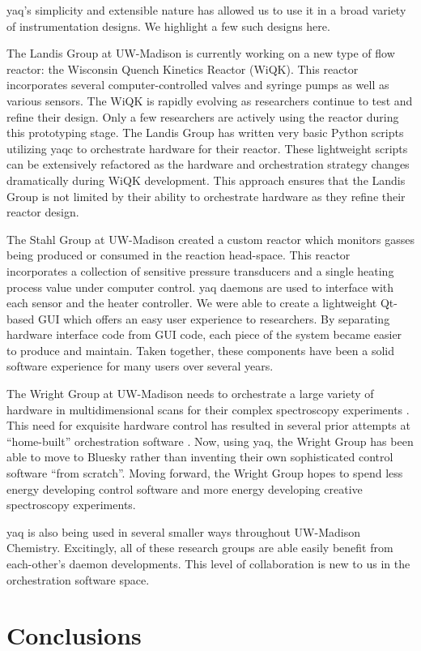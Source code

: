 \documentclass{article}
\begin{document}
yaq's simplicity and extensible nature has allowed us to use it in a broad variety of instrumentation designs.
We highlight a few such designs here.

The Landis Group at UW-Madison is currently working on a new type of flow reactor: the Wisconsin Quench Kinetics Reactor (WiQK).
This reactor incorporates several computer-controlled valves and syringe pumps as well as various sensors.
The WiQK is rapidly evolving as researchers continue to test and refine their design.
Only a few researchers are actively using the reactor during this prototyping stage.
The Landis Group has written very basic Python scripts utilizing yaqc to orchestrate hardware for their reactor.
These lightweight scripts can be extensively refactored as the hardware and orchestration strategy changes dramatically during WiQK development.
This approach ensures that the Landis Group is not limited by their ability to orchestrate hardware as they refine their reactor design.

The Stahl Group at UW-Madison created a custom reactor which monitors gasses being produced or consumed in the reaction head-space.  \cite{SalazarChaseA2021a}
This reactor incorporates a collection of sensitive pressure transducers and a single heating process value under computer control.
yaq daemons are used to interface with each sensor and the heater controller.
We were able to create a lightweight Qt-based GUI which offers an easy user experience to researchers.
By separating hardware interface code from GUI code, each piece of the system became easier to produce and maintain.
Taken together, these components have been a solid software experience for many users over several years.

The Wright Group at UW-Madison needs to orchestrate a large variety of hardware in multidimensional scans for their complex spectroscopy experiments \cite{MukamelShaul2000a, WrightJohnCurtis2011a}.
This need for exquisite hardware control has resulted in several prior attempts at ``home-built'' orchestration software \cite{CarlsonRogerJohn1988a, MeyerKentAlbert2004b, KainSchuyler2017a, ThompsonBlaiseJonathan2018a}.
Now, using yaq, the Wright Group has been able to move to Bluesky rather than inventing their own sophisticated control software ``from scratch''.
Moving forward, the Wright Group hopes to spend less energy developing control software and more energy developing creative spectroscopy experiments.

yaq is also being used in several smaller ways throughout UW-Madison Chemistry.
Excitingly, all of these research groups are able easily benefit from each-other's daemon developments.
This level of collaboration is new to us in the orchestration software space.

\section{Conclusions}

\clearpage


\end{document}
